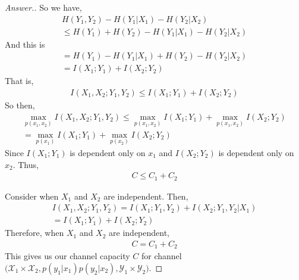 \documentclass[10pt,twoside]{article}
\begin{document}
\begin{itemize}
\begin{proof}[Answer.]
    So we have,
    \begin{gather*}
        H(Y_1, Y_2) - H(Y_1|X_1) - H(Y_2|X_2) \\
        \leq H(Y_1) + H(Y_2) - H(Y_1|X_1) - H(Y_2|X_2)
    \end{gather*}
    And this is
    \begin{gather*}
        = H(Y_1) - H(Y_1|X_1) + H(Y_2) - H(Y_2|X_2) \\
        = I(X_1;Y_1) + I(X_2;Y_2)
    \end{gather*} 
    That is,
    \begin{gather*}
        I(X_1, X_2;Y_1, Y_2)\leq I(X_1;Y_1) + I(X_2;Y_2)
    \end{gather*}
    So then,
    \begin{gather*}
        \max_{p(x_1, x_2)}I(X_1, X_2;Y_1, Y_2) \leq \max_{p(x_1, x_2)}I(X_1;Y_1) + \max_{p(x_1, x_2)}I(X_2;Y_2) \\
        = \max_{p(x_1)}I(X_1;Y_1) + \max_{p(x_2)}I(X_2;Y_2)
    \end{gather*}
    Since $I(X_1;Y_1)$ is dependent only on $x_1$ and $I(X_2;Y_2)$ is dependent only on $x_2$. Thus,
    \begin{gather*}
        C \leq C_1 + C_2
    \end{gather*}

    Consider when $X_1$ and $X_2$ are independent. Then, 
    \begin{gather*}
        I(X_1, X_2;Y_1, Y_2) = I(X_1;Y_1, Y_2) + I(X_2;Y_1, Y_2|X_1) \\
        = I(X_1;Y_1) + I(X_2;Y_2)
    \end{gather*}
    Therefore, when $X_1$ and $X_2$ are independent, 
    \begin{gather*}
        C = C_1 + C_2
    \end{gather*}
    This gives us our channel capacity $C$ for channel \newline$\Big( \mathcal{X}_1\times \mathcal{X}_2, p(y_1|x_1)p(y_2|x_2),\mathcal{Y}_1\times \mathcal{Y}_2 \Big)$.
    
    \end{proof}

    \newpage
    

\end{itemize}
\end{document}
